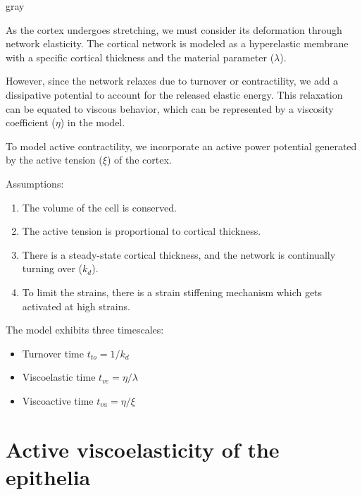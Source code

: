 \begin{center}
	
	\begin{mybox}{gray}{ }
		
	As the cortex undergoes stretching, we must consider its deformation through network elasticity. The cortical network is modeled as a hyperelastic membrane with a specific cortical thickness and the material parameter ($\lambda$).
	
	However, since the network relaxes due to turnover or contractility, we add a dissipative potential to account for the released elastic energy. This relaxation can be equated to viscous behavior, which can be represented by a viscosity coefficient ($\eta$) in the model. 
	
	To model active contractility, we incorporate an active power potential generated by the active tension ($\xi$) of the cortex. 
	
	Assumptions: 
	\begin{enumerate}
		\item The volume of the cell is conserved.
		\item The active tension is proportional to cortical thickness.
		\item There is a steady-state cortical thickness, and the network is continually turning over ($k_d$).
		\item To limit the strains, there is a strain stiffening mechanism which gets activated at high strains.		
	\end{enumerate}
	
	The model exhibits three timescales: 
	
	\begin{itemize}
		\item Turnover time $t_{to} = 1/k_d$
		\item Viscoelastic time $t_{ve} = \eta/\lambda$
		\item Viscoactive time $t_{va} = \eta/\xi$
	\end{itemize}
		
	\end{mybox}
	
\end{center}


\hypertarget{active-viscoelasticity-of-the-epithelia}{%
	\section{Active viscoelasticity of the
		epithelia}\label{active-viscoelasticity-of-the-epithelia}}
	

